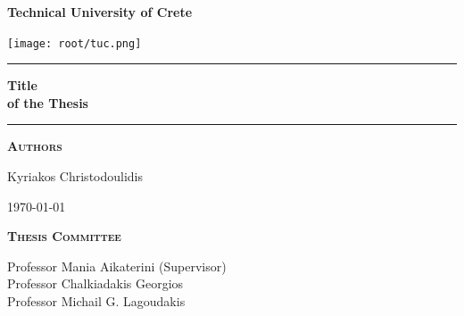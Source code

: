 
\begin{titlepage}
\begin{center}
\vspace{2cm}


\vspace{2.5cm}
{ \huge \bfseries Technical University of Crete} %
\vspace{2.5cm}


\texttt{[image: root/tuc.png]}~\\[1cm]
\vspace{2cm}

\vspace{2cm}

\hrule
\vspace{.5cm}
{ \huge \bfseries Title\\ of the Thesis} %
\vspace{.5cm}

\hrule
\vspace{1.5cm}

\textsc{\textbf{Authors}}\\
\vspace{.5cm}
\centering

Kyriakos Christodoulidis\\

\vspace{4cm}

\centering \today %

\vspace{4cm}

\textsc{\textbf{Thesis Committee}}\\

\vspace{1cm}

Professor Mania Aikaterini (Supervisor)\\
Professor Chalkiadakis Georgios\\
Professor Michail G. Lagoudakis\\
\end{center}
\end{titlepage}